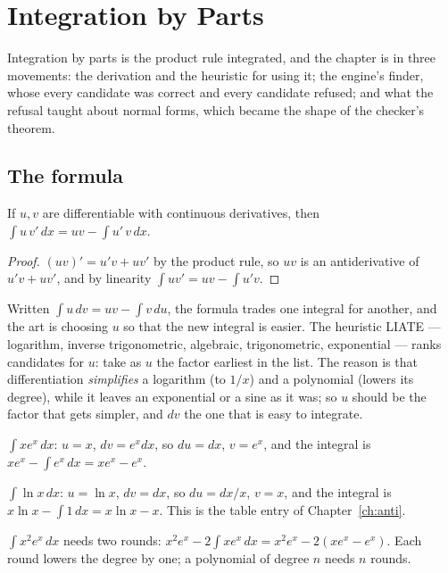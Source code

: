 \chapter{Integration by Parts}\label{ch:parts}

Integration by parts is the product rule integrated, and the chapter is in three movements:
the derivation and the heuristic for using it; the engine's finder, whose every candidate was
correct and every candidate refused; and what the refusal taught about normal forms, which
became the shape of the checker's theorem.

\section{The formula}

\begin{theorem}
  If $u, v$ are differentiable with continuous derivatives, then
  $\int u\,v'\,dx = uv - \int u'\,v\,dx$.
\end{theorem}
\begin{proof}
  $(uv)' = u'v + uv'$ by the product rule, so $uv$ is an antiderivative of $u'v + uv'$, and by
  linearity $\int uv' = uv - \int u'v$.
\end{proof}

Written $\int u\,dv = uv - \int v\,du$, the formula trades one integral for another, and the art
is choosing $u$ so that the new integral is easier. The heuristic LIATE --- logarithm, inverse
trigonometric, algebraic, trigonometric, exponential --- ranks candidates for $u$: take as $u$
the factor earliest in the list. The reason is that differentiation \emph{simplifies} a
logarithm (to $1/x$) and a polynomial (lowers its degree), while it leaves an exponential or a
sine as it was; so $u$ should be the factor that gets simpler, and $dv$ the one that is easy to
integrate.

\begin{example}
  $\int x e^x\,dx$: $u = x$, $dv = e^x dx$, so $du = dx$, $v = e^x$, and the integral is
  $x e^x - \int e^x\,dx = x e^x - e^x$.
\end{example}

\begin{example}
  $\int \ln x\,dx$: $u = \ln x$, $dv = dx$, so $du = dx/x$, $v = x$, and the integral is
  $x \ln x - \int 1\,dx = x \ln x - x$. This is the table entry of Chapter~\ref{ch:anti}.
\end{example}

\begin{example}
  $\int x^2 e^x\,dx$ needs two rounds: $x^2 e^x - 2\int x e^x\,dx = x^2 e^x - 2(x e^x - e^x)$.
  Each round lowers the degree by one; a polynomial of degree $n$ needs $n$ rounds.
\end{example}

